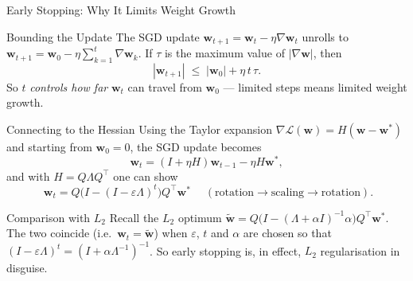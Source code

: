 \documentclass{beamer}
\begin{document}
\begin{frame}[shrink=10]{Early Stopping: Why It Limits Weight Growth}
  \begin{block}{Bounding the Update}
    The SGD update $\mathbf{w}_{t+1} = \mathbf{w}_t - \eta\nabla\mathbf{w}_t$
    unrolls to $\mathbf{w}_{t+1} = \mathbf{w}_0 - \eta\sum_{k=1}^{t}\nabla\mathbf{w}_k$.
    If $\tau$ is the maximum value of $|\nabla\mathbf{w}|$, then
    \[
      |\mathbf{w}_{t+1}| \;\le\; |\mathbf{w}_0| + \eta\,t\,\tau .
    \]
    So $t$ \emph{controls how far} $\mathbf{w}_t$ can travel from
    $\mathbf{w}_0$ --- limited steps means limited weight growth.
  \end{block}

  \begin{block}{Connecting to the Hessian}
    Using the Taylor expansion $\nabla\mathcal L(\mathbf{w}) = H(\mathbf{w}-\mathbf{w}^{*})$
    and starting from $\mathbf{w}_0 = 0$, the SGD update becomes
    \[
      \mathbf{w}_t = (I+\eta H)\mathbf{w}_{t-1} - \eta H\mathbf{w}^{*},
    \]
    and with $H = Q\Lambda Q^{\top}$ one can show
    \[
      \boxed{\;
        \mathbf{w}_t
          = Q\bigl(I - (I-\varepsilon\Lambda)^{t}\bigr)Q^{\top}\mathbf{w}^{*}
      \;}
      \quad(\text{rotation}\to\text{scaling}\to\text{rotation}).
    \]
  \end{block}

  \begin{alertblock}{Comparison with $L_2$}
    Recall the $L_2$ optimum
    $\tilde{\mathbf{w}} = Q\bigl(I - (\Lambda+\alpha I)^{-1}\alpha\bigr)Q^{\top}\mathbf{w}^{*}$.
    The two coincide (i.e.\ $\mathbf{w}_t = \tilde{\mathbf{w}}$) when
    $\varepsilon$, $t$ and $\alpha$ are chosen so that
    $(I-\varepsilon\Lambda)^{t} = (I+\alpha\Lambda^{-1})^{-1}$. So early
    stopping is, in effect, $L_2$ regularisation in disguise.
  \end{alertblock}
\end{frame}
\end{document}
